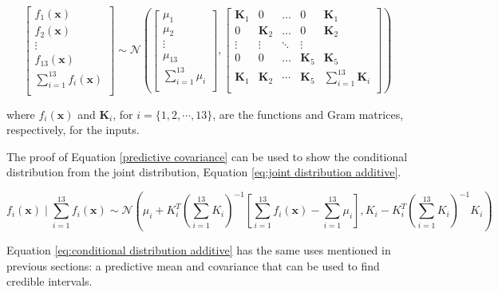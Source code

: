 \documentclass[12pt,a4paper]{article}
\begin{document}
\begin{equation}
\begin{bmatrix} 
f_1(\mathbf{x}) \\
f_2(\mathbf{x}) \\
\vdots \\
f_{13}(\mathbf{x}) \\
\sum_{i=1}^{13} f_i(\mathbf{x}) \\
\end{bmatrix}
\sim \mathcal{N}\left(
\begin{bmatrix} 
\mu_1 \\
\mu_2 \\
\vdots \\
\mu_{13} \\
\sum_{i=1}^{13} \mu_i \\
\end{bmatrix},
 \begin{bmatrix}
\mathbf{K}_1 & 0  & \dots & 0 & \mathbf{K}_1 \\
0 & \mathbf{K}_2  & \dots & 0 & \mathbf{K}_2\\
\vdots & \vdots &  \ddots & \vdots \\
0 & 0 & \dots & \mathbf{K}_5 & \mathbf{K}_5 \\
\mathbf{K}_1 & \mathbf{K}_2 & \cdots & \mathbf{K}_5 & \sum_{i=1}^{13} \mathbf{K}_i \\
\end{bmatrix}
\right)
\label{eq:joint distribution additive}
\end{equation}

where \(f_i(\mathbf{x})\) and \(\mathbf{K}_i\), for \(i=\{1,2,\cdots,13\}\), are the functions and Gram matrices, respectively, for the inputs.

The proof of Equation \eqref{predictive covariance} can be used to show the conditional distribution from the joint distribution, Equation \eqref{eq:joint distribution additive}.

\begin{equation}
f_i(\mathbf{x}) \mid \sum_{i=1}^{13} f_i(\mathbf{x}) \sim \mathcal{N}\left( \mu_i + K_i^T \left( \sum_{i=1}^{13} K_i \right)^{-1} \left[ \sum_{i=1}^{13} f_i(\mathbf{x}) - \sum_{i=1}^{13} \mu_i \right], K_i - K_i^T \left( \sum_{i=1}^{13} K_i \right)^{-1} K_i \right)
\label{eq:conditional distribution additive}
\end{equation}

Equation \eqref{eq:conditional distribution additive} has the same uses mentioned in previous sections: a predictive mean and covariance that can be used to find credible intervals.
\end{document}
